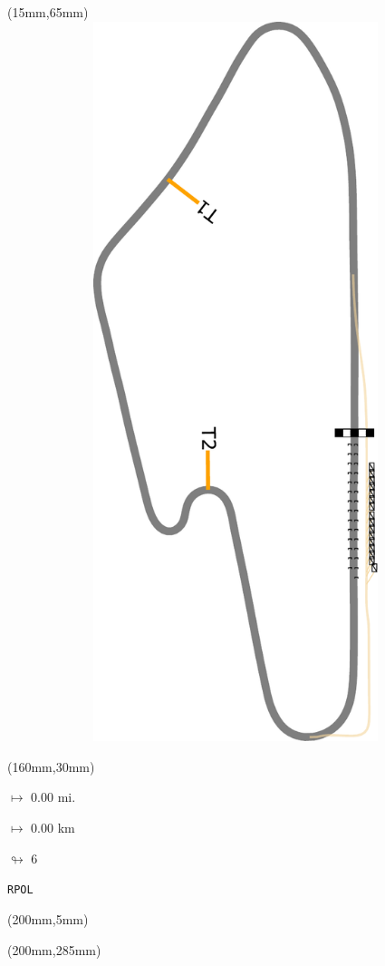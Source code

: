 \begin{textblock*}{185mm}(15mm,65mm)%
\centering
\mbox{\includegraphics[width=185mm,height=210mm,keepaspectratio]{PT/RPOL.pdf}}
\end{textblock*}
\begin{textblock*}{40mm}(160mm,30mm)%
\Large
\par$\mapsto$ 0.00 mi.
\par$\mapsto$ 0.00 km
\par$\looparrowright$ 6
\par\hfill\tiny\tt RPOL\\
\end{textblock*}
\begin{textblock*}{20mm}(200mm,5mm)%
\fbox{\thepage}
\label{RPOL}
\end{textblock*}
\begin{textblock*}{20mm}(200mm,285mm)%
\fbox{\thepage}
\end{textblock*}

